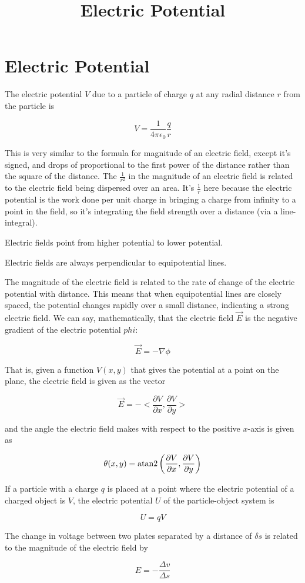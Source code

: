\documentclass{article}
\title{Electric Potential}
\begin{document}
\section{Electric Potential}

The electric potential $V$ due to a particle of charge $q$ at any radial distance $r$ from the particle is

\[ V = \frac{1}{4 \pi \epsilon_0} \frac{q}{r} \]

This is very similar to the formula for magnitude of an electric field, except it's signed, and drops of proportional to the first power of the distance rather than the square of the distance. The $\frac{1}{r^2}$ in the magnitude of an electric field is related to the electric field being dispersed over an area. It's $\frac{1}{r}$ here because the electric potential is the work done per unit charge in bringing a charge from infinity to a point in the field, so it's integrating the field strength over a distance (via a \@{line-integral}).

Electric fields point from higher potential to lower potential.

Electric fields are always \@{perpendicular} to equipotential lines.

The magnitude of the electric field is related to the rate of change of the electric potential with distance. This means that when equipotential lines are closely spaced, the potential changes rapidly over a small distance, indicating a strong electric field. We can say, mathematically, that the electric field $\vec{E}$ is the negative \@{gradient} of the electric potential $phi$:

\[ \vec{E} = -\nabla \phi \]

That is, given a function $V(x,y)$ that gives the potential at a point on the plane, the electric field is given as the vector

\[ \vec{E} = -<\frac{\partial V}{\partial x}, \frac{\partial V}{\partial y}> \]

and the angle the electric field makes with respect to the positive $x$-axis is given as

\[ \theta(x,y) = \text{atan2}\left(\frac{\partial V}{\partial x}, \frac{\partial V}{\partial y}\right) \]

If a particle with a charge $q$ is placed at a point where the electric potential of a charged object is $V$, the electric potential $U$ of the particle-object system is

\[ U = qV \]

The change in voltage between two plates separated by a distance of $\delta s$ is related to the magnitude of the electric field by

\[ E = -\frac{\Delta v}{\Delta s} \]
\end{document}
